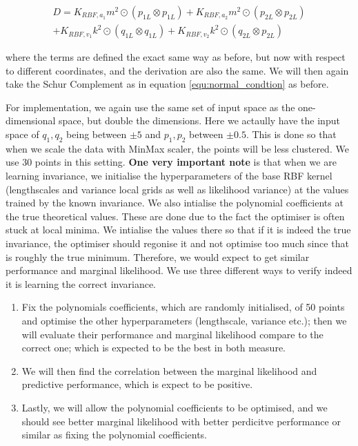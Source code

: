 \documentclass{statsmsc}
\begin{document}
\begin{gather*}
D=K_{RBF,a_1}m^2\odot(p_{1L}\otimes p_{1L}) + K_{RBF,a_2}m^2\odot(p_{2L}\otimes p_{2L})\\+K_{RBF,v_1}k^2\odot(q_{1L}\otimes q_{1L})+K_{RBF,v_2}k^2\odot(q_{2L}\otimes p_{2L})
\end{gather*}

where the terms are defined the exact same way as before, but now with respect to different coordinates, and the derivation are also the same.
We will then again take the Schur Complement as in equation \ref{equ:normal_condtion} as before.

For implementation, we again use the same set of input space as the one-dimensional space, but double the dimensions. 
Here we actaully have the input space of $q_1, q_2$ being between $\pm 5$ and $p_1, p_2$ between $\pm 0.5$. 
This is done so that when we scale the data with MinMax scaler, the points will be less clustered.
We use 30 points in this setting.
\textbf{One very important note} is that when we are learning invariance, we initialise the hyperparameters of the base RBF kernel (lengthscales and variance local grids as well as likelihood variance) at the values trained by the known invariance.
We also intialise the polynomial coefficients at the true theoretical values.
These are done due to the fact the optimiser is often stuck at local minima.
We intialise the values there so that if it is indeed the true invariance, the optimiser should regonise it and not optimise too much since that is roughly the true minimum.
Therefore, we would expect to get similar performance and marginal likelihood.
We use three different ways to verify indeed it is learning the correct invariance.
\begin{enumerate}
  \item Fix the polynomials coefficients, which are randomly initialised, of 50 points and optimise the other hyperparameters (lengthscale, variance etc.); then we will evaluate their performance and marginal likelihood compare to the correct one; which is expected to be the best in both measure. 
  \item We will then find the correlation between the marginal likelihood and predictive performance, which is expect to be positive.
  \item Lastly, we will allow the polynomial coefficients to be optimised, and we should see better marginal likelihood with better perdicitve performance or similar as fixing the polynomial coefficients.
\end{enumerate}
\end{document}
